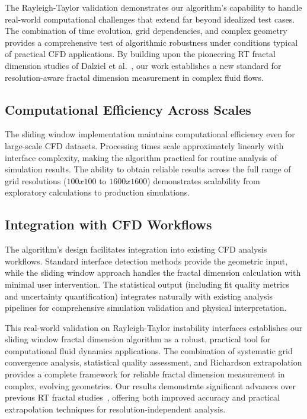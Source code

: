 \documentclass[preprint,12pt]{elsarticle}
\def\times{x}%
\begin{document}
The Rayleigh-Taylor validation demonstrates our algorithm's capability to handle real-world computational challenges that extend far beyond idealized test cases. The combination of time evolution, grid dependencies, and complex geometry provides a comprehensive test of algorithmic robustness under conditions typical of practical CFD applications. By building upon the pioneering RT fractal dimension studies of Dalziel et al.~\cite{dalziel1999}, our work establishes a new standard for resolution-aware fractal dimension measurement in complex fluid flows.

\subsection{Computational Efficiency Across Scales}
\label{subsec:computational_efficiency}

The sliding window implementation maintains computational efficiency even for large-scale CFD datasets. Processing times scale approximately linearly with interface complexity, making the algorithm practical for routine analysis of simulation results. The ability to obtain reliable results across the full range of grid resolutions ($100 \times 100$ to $1600 \times 1600$) demonstrates scalability from exploratory calculations to production simulations.

\subsection{Integration with CFD Workflows}
\label{subsec:cfd_integration}

The algorithm's design facilitates integration into existing CFD analysis workflows. Standard interface detection methods provide the geometric input, while the sliding window approach handles the fractal dimension calculation with minimal user intervention. The statistical output (including fit quality metrics and uncertainty quantification) integrates naturally with existing analysis pipelines for comprehensive simulation validation and physical interpretation.

This real-world validation on Rayleigh-Taylor instability interfaces establishes our sliding window fractal dimension algorithm as a robust, practical tool for computational fluid dynamics applications. The combination of systematic grid convergence analysis, statistical quality assessment, and Richardson extrapolation provides a complete framework for reliable fractal dimension measurement in complex, evolving geometries. Our results demonstrate significant advances over previous RT fractal studies~\cite{dalziel1999}, offering both improved accuracy and practical extrapolation techniques for resolution-independent analysis.
\end{document}
